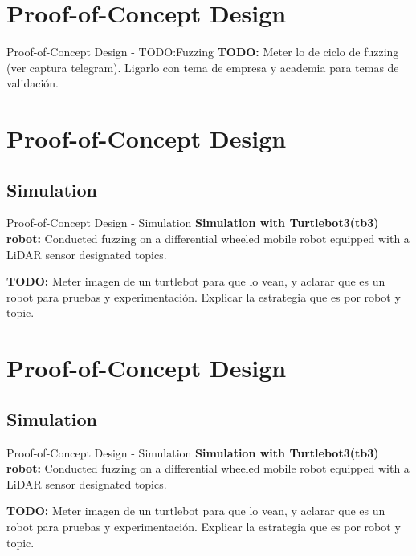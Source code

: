 \documentclass[aspectratio=169]{beamer}
\begin{document}
\section{Proof-of-Concept Design}

\begin{frame}{Proof-of-Concept Design - TODO:Fuzzing }
 \textbf{TODO:} Meter lo de ciclo de fuzzing (ver captura telegram). Ligarlo con tema de empresa y academia para temas de validación.

\end{frame}

\section{Proof-of-Concept Design}
\subsection{Simulation}
\begin{frame}{Proof-of-Concept Design - Simulation}
 \textbf{Simulation with Turtlebot3(tb3) robot:} Conducted fuzzing on a differential wheeled mobile robot equipped with a LiDAR sensor designated topics.

\textbf{TODO: } Meter imagen de un turtlebot para que lo vean, y aclarar que es un robot para pruebas y experimentación. Explicar la estrategia que es por robot y topic.

\end{frame}

\section{Proof-of-Concept Design}
\subsection{Simulation}
\begin{frame}{Proof-of-Concept Design - Simulation}
 \textbf{Simulation with Turtlebot3(tb3) robot:} Conducted fuzzing on a differential wheeled mobile robot equipped with a LiDAR sensor designated topics.

\textbf{TODO: } Meter imagen de un turtlebot para que lo vean, y aclarar que es un robot para pruebas y experimentación. Explicar la estrategia que es por robot y topic.


\end{frame}
\end{document}
